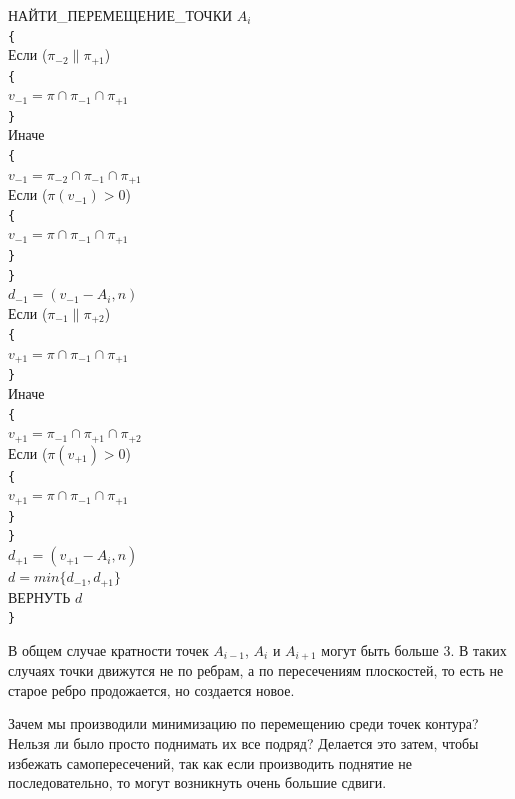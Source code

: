 \documentclass[a4paper,12pt, titlepage]{article}
\begin{document}
\begin{flushleft}
НАЙТИ\_ПЕРЕМЕЩЕНИЕ\_ТОЧКИ $A_{i}$\\
\verb"{"\\
\quad Если ($\pi_{-2} \parallel \pi_{+1}$)\\
\quad\verb"{"\\
\quad\quad $v_{-1} = \pi \cap \pi_{-1} \cap \pi_{+1}$\\
\quad\verb"}" \\
\quad Иначе \\
\quad\verb"{"\\
\quad\quad $v_{-1} = \pi_{-2} \cap \pi_{-1} \cap \pi_{+1}$\\
\quad\quad Если ($\pi(v_{-1}) > 0$)\\
\quad\quad \verb"{"\\
\quad\quad\quad $v_{-1} = \pi \cap \pi_{-1} \cap \pi_{+1}$\\
\quad\quad\verb"}" \\
\quad\verb"}" \\
\quad $d_{-1} = (v_{-1} - A_{i}, n)$\\

\quad Если ($\pi_{-1} \parallel \pi_{+2}$)\\
\quad \verb"{" \\
\quad\quad $v_{+1} = \pi \cap \pi_{-1} \cap \pi_{+1}$\\
\quad \verb"}"\\
\quad Иначе \\
\quad \verb"{" \\
\quad\quad $v_{+1} = \pi_{-1} \cap \pi_{+1} \cap \pi_{+2}$\\
\quad\quad Если ($\pi(v_{+1}) > 0$)\\
\quad\quad \verb"{"\\
\quad\quad\quad $v_{+1} = \pi \cap \pi_{-1} \cap \pi_{+1}$\\
\quad\quad \verb"}"\\
\quad \verb"}"\\
\quad $d_{+1} = (v_{+1} - A_{i}, n)$\\

\quad $d = min\{d_{-1}, d_{+1}\}$\\
\quad ВЕРНУТЬ $d$\\
\verb"}"\\
\end{flushleft}
\begin{flushleft}
 В общем случае кратности точек $A_{i - 1}$, $A_{i}$ и $A_{i + 1}$ могут быть больше 3. В таких случаях
точки движутся не по ребрам, а по пересечениям плоскостей, то есть не старое ребро продожается, но 
создается новое.
\end{flushleft}
\begin{flushleft}
  Зачем мы производили минимизацию по перемещению среди точек контура? Нельзя ли было просто поднимать их 
все подряд? Делается это затем, чтобы избежать самопересечений, так как если производить поднятие не
последовательно, то могут возникнуть очень большие сдвиги.
\end{flushleft}
\end{document}
